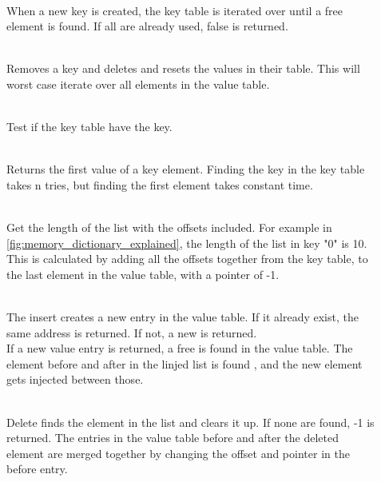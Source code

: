 \begin{description}
  \item[]\hfill\\
  When a new key is created, the key table is iterated over until a free element
  is found. If all are already used, false is returned.

  \item[]\hfill\\
  Removes a key and deletes and resets the values in their table. This will
  worst case iterate over all elements in the value table.

  \item[]\hfill\\
  Test if the key table have the key.

  \item[]\hfill\\
  Returns the first value of a key element. Finding the key in the key table takes
  n tries, but finding the first element takes constant time.

  \item[]\hfill\\
  Get the length of the list with the offsets included. For example in
  \autoref{fig:memory_dictionary_explained}, the length of the list in
    key "0" is 10. This is calculated by adding all
    the offsets together from the key table, to the last element in the
    value table, with a pointer of -1.

  \item[]\hfill\\
  The insert creates a new entry in the value table. If it already exist, the
  same address is returned. If not, a new is returned. \\
  If a new value entry is returned, a free is found in the value table.
  The element before and after in the linjed list is found , and the new element
  gets injected between those.

  \item[]\hfill\\
  Delete finds the element in the list and clears it up. If none are found, -1 is
  returned. The entries in the value table before and after the deleted element
  are merged together by changing the offset and pointer in the before entry.



\end{description}
